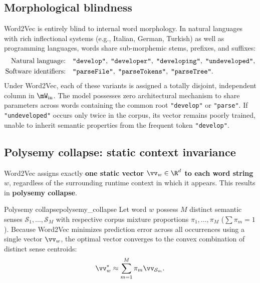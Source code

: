 \documentclass[../../main.tex]{subfiles}
\begin{document}
\subsection{Morphological blindness}
\label{subsec:morphological_blindness}

Word2Vec is entirely blind to internal word morphology. In natural languages with rich inflectional systems (e.g., Italian, German, Turkish) as well as programming languages, words share sub-morphemic stems, prefixes, and suffixes:
\begin{align*}
\text{Natural language:} \quad &\text{\texttt{"develop"}}, \; \text{\texttt{"developer"}}, \; \text{\texttt{"developing"}}, \; \text{\texttt{"undeveloped"}}, \\
\text{Software identifiers:} \quad &\text{\texttt{"parseFile"}}, \; \text{\texttt{"parseTokens"}}, \; \text{\texttt{"parseTree"}}.
\end{align*}
Under Word2Vec, each of these variants is assigned a totally disjoint, independent column in $\mW_{\text{in}}$. The model possesses zero architectural mechanism to share parameters across words containing the common root \texttt{"develop"} or \texttt{"parse"}. If \texttt{"undeveloped"} occurs only twice in the corpus, its vector remains poorly trained, unable to inherit semantic properties from the frequent token \texttt{"develop"}.

\subsection{Polysemy collapse: static context invariance}
\label{subsec:polysemy_collapse}

Word2Vec assigns exactly \textbf{one static vector $\vv_w \in \R^d$ to each word string $w$}, regardless of the surrounding runtime context in which it appears. This results in \textbf{polysemy collapse}.

\begin{definition}{Polysemy collapse}{polysemy_collapse}
Let word $w$ possess $M$ distinct semantic senses $\mathcal{S}_1, \dots, \mathcal{S}_M$ with respective corpus mixture proportions $\pi_1, \dots, \pi_M$ ($\sum \pi_m = 1$). Because Word2Vec minimizes prediction error across all occurrences using a single vector $\vv_w$, the optimal vector converges to the convex combination of distinct sense centroids:
\begin{equation}
\label{eq:polysemy_convex_combination}
\vv_w^* \approx \sum_{m=1}^M \pi_m \vv_{\mathcal{S}_m}.
\end{equation}
\end{definition}
\end{document}
